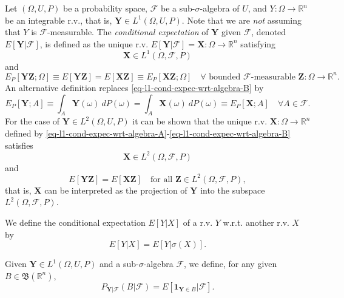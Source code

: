 Let $(\Omega,U,P)$ be a probability space,
$\mathcal{F}$ be a sub-$\sigma$-algebra of $U$,
and $Y:\Omega\rightarrow\mathbb{R}^n$ be an integrable r.v., that is, $\mathbf{Y}\in L^1(\Omega,U,P)$.
Note that we are {\it not} assuming that $Y$ is $\mathcal{F}$-measurable.
The {\it conditional expectation} of $\mathbf{Y}$ given $\mathcal{F}$,
denoted $E[\mathbf{Y}|\mathcal{F}]$,
is defined \cite{JaPr04} as the unique r.v. $E[\mathbf{Y}|\mathcal{F}]=\mathbf{X}:\Omega\rightarrow\mathbb{R}^n$ satisfying
\begin{equation}\label{eq-l1-cond-expec-wrt-algebra-A}
\mathbf{X}\in L^1(\Omega,\mathcal{F},P)
\end{equation}
and
\begin{equation}\label{eq-l1-cond-expec-wrt-algebra-B}
E_P[\mathbf{Y}\mathbf{Z};\Omega]\equiv E[\mathbf{Y}\mathbf{Z}] = E[\mathbf{X}\mathbf{Z}] \equiv E_P[\mathbf{X}\mathbf{Z};\Omega]
\quad
\forall\mbox{ bounded }\mathcal{F}\mbox{-measurable }\mathbf{Z}:\Omega\rightarrow\mathbb{R}^n.
\end{equation}
An alternative definition \cite{Du05} replaces \eqref{eq-l1-cond-expec-wrt-algebra-B} by
\begin{equation*}
E_P[\mathbf{Y};A]\equiv \int_A \mathbf{Y}(\omega)~dP(\omega) = \int_A \mathbf{X}(\omega)~dP(\omega)\equiv E_P[\mathbf{X};A] \quad\forall A\in\mathcal{F}.
\end{equation*}
For the case of $\mathbf{Y}\in L^2(\Omega,U,P)$ it can be shown \cite{JaPr04} that the
unique r.v. $\mathbf{X}:\Omega\rightarrow\mathbb{R}^n$ defined by \eqref{eq-l1-cond-expec-wrt-algebra-A}-\eqref{eq-l1-cond-expec-wrt-algebra-B} satisfies
\begin{equation}\label{eq-l2-cond-expec-wrt-algebra-A}
\mathbf{X}\in L^2(\Omega,\mathcal{F},P)
\end{equation}
and
\begin{equation}\label{eq-l2-cond-expec-wrt-algebra-B}
E[\mathbf{Y}\mathbf{Z}] = E[\mathbf{X}\mathbf{Z}]
\quad
\mbox{for all }\mathbf{Z}\in L^2(\Omega,\mathcal{F},P),
\end{equation}
that is, $\mathbf{X}$ can be interpreted as the projection of $\mathbf{Y}$ into the subspace $L^2(\Omega,\mathcal{F},P)$.

We define the conditional expectation $E[Y|X]$ of a r.v. $Y$ w.r.t. another r.v. $X$ by
\begin{equation*}
E[Y|X] = E[Y|\sigma(X)].
\end{equation*}

Given $\mathbf{Y}\in L^1(\Omega,U,P)$ and
a sub-$\sigma$-algebra $\mathcal{F}$,
we define,
for any given $B\in\mathfrak{B}(\mathbb{R}^n)$,
\begin{equation}\label{eq-cond-prob-wrt-algebra}
P_{\mathbf{Y}|\mathcal{F}}(B|\mathcal{F}) = E[\mathbf{1}_{\mathbf{Y}\in B}|\mathcal{F}].
\end{equation}

